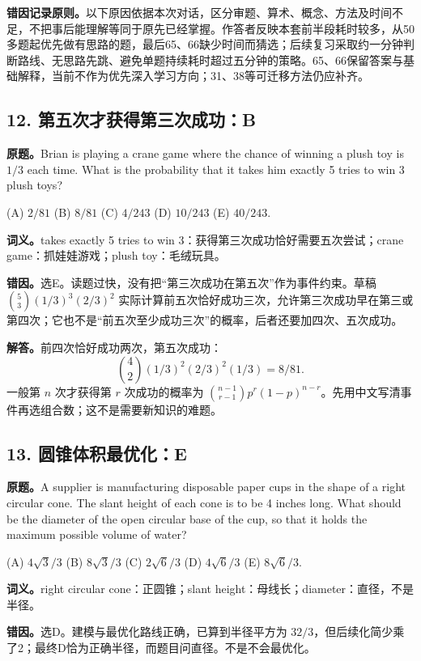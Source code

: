 \documentclass[11pt,a4paper,fontset=fandol]{ctexart}
\begin{document}
\textbf{错因记录原则。}以下原因依据本次对话，区分审题、算术、概念、方法及时间不足，不把事后能理解等同于原先已经掌握。作答者反映本套前半段耗时较多，从50多题起优先做有思路的题，最后65、66缺少时间而猜选；后续复习采取约一分钟判断路线、无思路先跳、避免单题持续耗时超过五分钟的策略。65、66保留答案与基础解释，当前不作为优先深入学习方向；31、38等可迁移方法仍应补齐。

\subsection{12. 第五次才获得第三次成功：B}
\label{ms:q12}
\textbf{原题。}Brian is playing a crane game where the chance of winning a plush toy is $1/3$ each time. What is the probability that it takes him exactly 5 tries to win 3 plush toys?

(A) $2/81$ \quad (B) $8/81$ \quad (C) $4/243$ \quad (D) $10/243$ \quad (E) $40/243$.

\textbf{词义。}takes exactly 5 tries to win 3：获得第三次成功恰好需要五次尝试；crane game：抓娃娃游戏；plush toy：毛绒玩具。

\textbf{错因。}选E。读题过快，没有把“第三次成功在第五次”作为事件约束。草稿 $\binom53(1/3)^3(2/3)^2$ 实际计算前五次恰好成功三次，允许第三次成功早在第三或第四次；它也不是“前五次至少成功三次”的概率，后者还要加四次、五次成功。

\textbf{解答。}前四次恰好成功两次，第五次成功：
\[
\binom42(1/3)^2(2/3)^2(1/3)=\boxed{8/81}.
\]
一般第 $n$ 次才获得第 $r$ 次成功的概率为 $\binom{n-1}{r-1}p^r(1-p)^{n-r}$。先用中文写清事件再选组合数；这不是需要新知识的难题。

\subsection{13. 圆锥体积最优化：E}
\label{ms:q13}
\textbf{原题。}A supplier is manufacturing disposable paper cups in the shape of a right circular cone. The slant height of each cone is to be 4 inches long. What should be the diameter of the open circular base of the cup, so that it holds the maximum possible volume of water?

(A) $4\sqrt3/3$ \quad (B) $8\sqrt3/3$ \quad (C) $2\sqrt6/3$ \quad (D) $4\sqrt6/3$ \quad (E) $8\sqrt6/3$.

\textbf{词义。}right circular cone：正圆锥；slant height：母线长；diameter：直径，不是半径。

\textbf{错因。}选D。建模与最优化路线正确，已算到半径平方为 $32/3$，但后续化简少乘了2；最终D恰为正确半径，而题目问直径。不是不会最优化。
\end{document}

